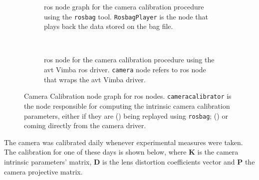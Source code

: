 \begin{figure}[!ht]
	\vspace{5mm}
	\centering
	\begin{subfigure}[c]{0.8\textwidth}
		\centering
		\def\svgwidth{\columnwidth}
		\graphicspath{{img/camera-calibration/}}
		
		\caption{\ac{ros} node graph for the camera calibration procedure using the \texttt{rosbag} tool. \texttt{RosbagPlayer} is the node that plays back the data stored on the bag file.}
		\label{fig:camera-calibration-bag-rosgraph}
	\end{subfigure}
	\vspace{5mm} \\ 
	\begin{subfigure}[c]{0.8\textwidth}
		\centering
		\def\svgwidth{\columnwidth}
		\graphicspath{{img/camera-calibration/}}
		
		\caption{\ac{ros} node for the camera calibration procedure using the \ac{avt} Vimba \ac{ros} driver. \texttt{camera} node refers to \ac{ros} node that wraps the \ac{avt} Vimba driver.}
		\label{fig:camera-calibration-avt-rosgraph}
	\end{subfigure}
	\caption[Camera calibration \acs{ros} node diagram.]{Camera Calibration node graph for \ac{ros} nodes. \texttt{cameracalibrator} is the node responsible for computing the intrinsic camera calibration parameters, either if they are () being replayed using \texttt{rosbag}; () or coming directly from the camera driver.}
	\label{fig:camera-calibration-rosgraph}
\end{figure}

The camera was calibrated daily whenever experimental measures were taken. The calibration for one of these days is shown below, where $\mathbf{K}$ is the camera intrinsic parameters' matrix, $\mathbf{D}$ is the lens distortion coefficients vector and $\mathbf{P}$ the camera projective matrix. %

